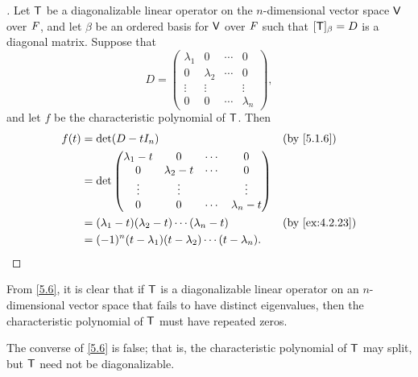 \begin{proof}[]
  Let \(\mathsf{T}\) be a diagonalizable linear operator on the \(n\)-dimensional vector space \(\mathsf{V}\) over \(\mathit{F}\), and let \(\beta\) be an ordered basis for \(\mathsf{V}\) over \(\mathit{F}\) such that \([\mathsf{T}]_{\beta} = D\) is a diagonal matrix.
  Suppose that
  \[
    D = \begin{pmatrix}
      \lambda_1 & 0         & \cdots & 0         \\
      0         & \lambda_2 & \cdots & 0         \\
      \vdots    & \vdots    &        & \vdots    \\
      0         & 0         & \cdots & \lambda_n
    \end{pmatrix},
  \]
  and let \(f\) be the characteristic polynomial of \(\mathsf{T}\).
  Then
  \begin{align*}
    f(t) & = \det(D - t I_n)                                                &  & \text{(by \cref{5.1.6})}     \\
         & = \det\begin{pmatrix}
                   \lambda_1 - t & 0             & \cdots & 0             \\
                   0             & \lambda_2 - t & \cdots & 0             \\
                   \vdots        & \vdots        &        & \vdots        \\
                   0             & 0             & \cdots & \lambda_n - t
                 \end{pmatrix}                                       \\
         & = (\lambda_1 - t) (\lambda_2 - t) \cdots (\lambda_n - t)         &  & \text{(by \cref{ex:4.2.23})} \\
         & = (-1)^n (t - \lambda_1) (t - \lambda_2) \cdots (t - \lambda_n).
  \end{align*}
\end{proof}

\begin{note}
  From \cref{5.6}, it is clear that if \(\mathsf{T}\) is a diagonalizable linear operator on an \(n\)-dimensional vector space that fails to have distinct eigenvalues, then the characteristic polynomial of \(\mathsf{T}\) must have repeated zeros.

  The converse of \cref{5.6} is false;
  that is, the characteristic polynomial of \(\mathsf{T}\) may split, but \(\mathsf{T}\) need not be diagonalizable.
\end{note}


